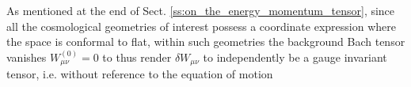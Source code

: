 As mentioned at the end of Sect. \ref{ss:on_the_energy_momentum_tensor}, since all the cosmological geometries of interest possess a coordinate expression where the space is conformal to flat, within such geometries the background Bach tensor vanishes $W^{(0)}_{\mu\nu} = 0$ to thus render $\delta W_{\mu\nu}$ to independently be a gauge invariant tensor, i.e. without reference to the equation of motion 
%
